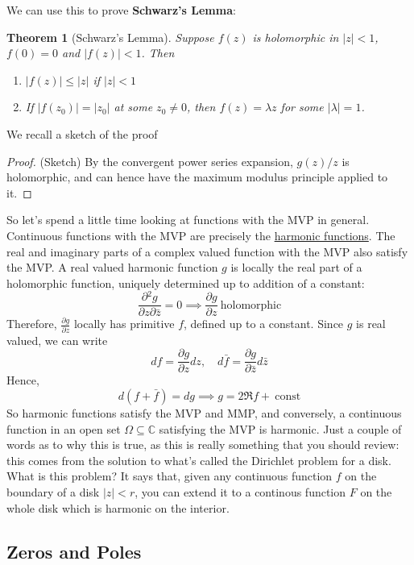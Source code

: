 \documentclass{article}
\newtheorem{theorem}{Theorem}
\newcommand{\mbb}[1]{\mathbb{#1}}
\newcommand{\prt}[2]{{\frac{\partial {#1}}{\partial {#2}}}}
\begin{document}
We can use this to prove \textbf{Schwarz's Lemma}:
\begin{theorem}[Schwarz's Lemma]
Suppose \(f(z)\) is holomorphic in \(|z| < 1\), \(f(0) = 0\) and \(|f(z)| < 1\). Then
\begin{enumerate}

  \item \(|f(z)| \leq |z|\) if \(|z| < 1\)

  \item If \(|f(z_0)| = |z_0|\) at some \(z_0 \neq 0\), then \(f(z) = \lambda z\) for some \(|\lambda| = 1\).

\end{enumerate}
\end{theorem}
We recall a sketch of the proof
\begin{proof} (Sketch)
By the convergent power series expansion, \(g(z) / z\) is holomorphic, and can hence have the maximum modulus principle applied to it.
\end{proof}
So let's spend a little time looking at functions with the MVP in general. Continuous functions with the MVP are precisely the \underline{harmonic functions}. The real and imaginary parts of a complex valued function with the MVP also satisfy the MVP. A real valued harmonic function \(g\) is locally the real part of a holomorphic function, uniquely determined up to addition of a constant:
\[
\prt{^2g}{z\partial\bar{z}} = 0 \implies \prt{g}{z} \ \text{holomorphic}
\]
Therefore, \(\prt{g}{z}\) locally has primitive \(f\), defined up to a constant. Since \(g\) is real valued, we can write
\[df = \prt{g}{z}dz, \quad d\bar{f} = \prt{g}{\bar{z}}d\bar{z}\]
Hence,
\[d(f + \bar{f}) = dg \implies g = 2\Re f + \ \text{const}\]
So harmonic functions satisfy the MVP and MMP, and conversely, a continuous function in an open set \(\Omega \subseteq \mbb{C}\) satisfying the MVP is harmonic. Just a couple of words as to why this is true, as this is really something that you should review: this comes from the solution to what's called the Dirichlet problem for a disk. What is this problem? It says that, given any continuous function \(f\) on the boundary of a disk \(|z| < r\), you can extend it to a continous function \(F\) on the whole disk which is harmonic on the interior.

\subsection{Zeros and Poles}
\end{document}
